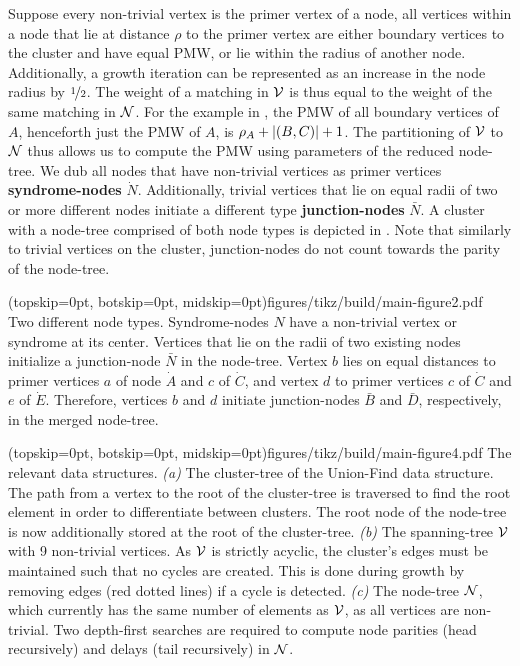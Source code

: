 Suppose every non-trivial vertex is the primer vertex of a node, all vertices within a node that lie at distance $\rho$ to the primer vertex are either boundary vertices to the cluster and have equal PMW, or lie within the radius of another node. Additionally, a growth iteration can be represented as an increase in the node radius by $\nicefrac{1}{2}$. The weight of a matching in $\mathcal{V}$ is thus equal to the weight of the same matching in $\mathcal{N}$. For the example in , the PMW of all boundary vertices of $A$, henceforth just the PMW of $A$, is $\rho_A + \lvert(B,C)\rvert +1$. The partitioning of $\mathcal{V}$ to $\mathcal{N}$ thus allows us to compute the PMW using parameters of the reduced node-tree. We dub all nodes that have non-trivial vertices as primer vertices \textbf{syndrome-nodes} $\dot{N}$. Additionally, trivial vertices that lie on equal radii of two or more different nodes initiate a different type \textbf{junction-nodes} $\bar{N}$. A cluster with a node-tree comprised of both node types is depicted in . Note that similarly to trivial vertices on the cluster, junction-nodes do not count towards the parity of the node-tree. 

\Figure[htb](topskip=0pt, botskip=0pt, midskip=0pt){figures/tikz/build/main-figure2.pdf}{
Two different node types. Syndrome-nodes $N$ have a non-trivial vertex or syndrome at its center. Vertices that lie on the radii of two existing nodes initialize a junction-node $\bar{N}$ in the node-tree. Vertex $b$ lies on equal distances to primer vertices $a$ of node $\dot{A}$ and $c$ of $\dot{C}$, and vertex $d$ to primer vertices $c$ of $\dot{C}$ and $e$ of $\dot{E}$. Therefore, vertices $b$ and $d$ initiate junction-nodes $\bar{B}$ and $\bar{D}$, respectively, in the merged node-tree. \label{fig:nodes}}

\Figure[hbt!](topskip=0pt, botskip=0pt, midskip=0pt){figures/tikz/build/main-figure4.pdf}{
    The relevant data structures. \emph{(a)} The cluster-tree of the Union-Find data structure. The path from a vertex to the root of the cluster-tree is traversed to find the root element in order to differentiate between clusters. The root node of the node-tree is now additionally stored at the root of the cluster-tree. \emph{(b)} The spanning-tree $\mathcal{V}$ with 9 non-trivial vertices. As $\mathcal{V}$ is strictly acyclic, the cluster's edges must be maintained such that no cycles are created. This is done during growth by removing edges (red dotted lines) if a cycle is detected. \emph{(c)} The node-tree $\mathcal{N}$, which currently has the same number of elements as $\mathcal{V}$, as all vertices are non-trivial. Two depth-first searches are required to compute node parities (head recursively) and delays (tail recursively) in $\mathcal{N}$.\label{fig:nodetypes}}

